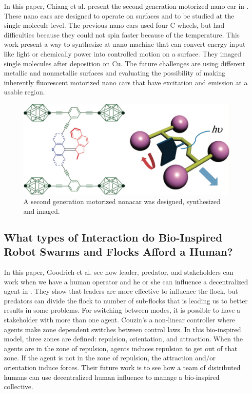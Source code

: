 \documentclass[letterpaper, 10 pt, conference]{ieeeconf}
\begin{document}
In this paper, Chiang et al. present the second generation motorized nano car in \cite{TourNanocar2012}. These nano cars are designed to operate on surfaces and to be studied at the single molecule level. The previous nano cars used four C wheels, but had difficulties because they could not spin faster because of the temperature. This work present a way to synthesize at nano machine that can convert energy input like light or chemically power into controlled motion on a surface. They imaged single molecules after deposition on Cu. The future challenges are using different metallic and nonmetallic surfaces and evaluating the possibility of making inherently fluorescent motorized nano cars that have excitation and emission at a usable region. 
\begin{figure}[h]
\begin{center}
\includegraphics[width=\columnwidth]{nanocar.png}
\caption{A second generation motorized nonacar was designed, synthesized and imaged\cite{TourNanocar2012}.
\label{fig:nanocar}}
\end{center}
\end{figure}
\subsection{What types of Interaction do Bio-Inspired Robot Swarms and Flocks Afford a Human?}

In this paper, Goodrich et al. see how leader, predator, and stakeholders can work when we have a human operator and he or she can influence a decentralized agent in \cite{Goodrich2012}. They show that leaders are more effective to influence the flock, but predators can divide the flock to number of sub-flocks that is leading us to better results in some problems. For switching between modes, it is possible to have a stakeholder with more than one agent. Couzin's a non-linear controller where agents make zone dependent switches between control laws. In this bio-inspired model, three zones are defined: repulsion, orientation, and attraction. When the agents are in the zone of repulsion, agents induces repulsion to get out of that zone. If the agent is not in the zone of repulsion, the attraction and/or orientation induce forces. Their future work is to see how a team of distributed humans can use decentralized human influence to manage a bio-inspired collective.
\end{document}
